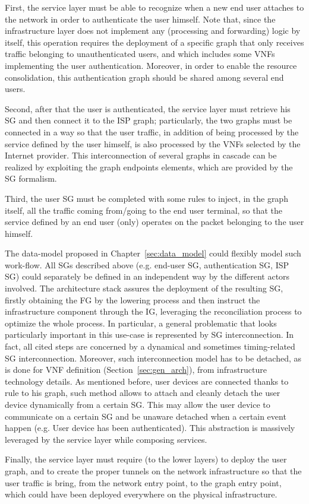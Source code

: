 First, the service layer must be able to recognize when a new end user attaches to the network in order to authenticate the user himself. 
Note that, since the infrastructure layer does not implement any (processing and forwarding) logic by itself, this operation requires the deployment of a specific graph that only receives traffic belonging to unauthenticated users, and which includes some VNFs implementing the user authentication.
Moreover, in order to enable the resource consolidation, this authentication graph should be shared among several end users.

Second, after that the user is authenticated, the service layer must retrieve his SG and then connect it to the ISP graph; particularly, the two graphs must be connected in a way so that the user traffic, in addition of being processed by the service defined by the user himself, is also processed by the VNFs selected by the Internet provider.
This interconnection of several graphs in cascade can be realized by exploiting the graph endpoints elements, which are provided by the SG formalism.

Third, the user SG must be completed with some rules  to inject, in the graph itself, all the traffic coming from/going to the end user terminal, so that the service defined by an end user (only) operates on the packet belonging to the user himself.


The data-model proposed in Chapter~\ref{sec:data_model} could flexibly model such work-flow. All SGs described above (e.g. end-user SG, authentication SG, ISP SG) could separately be defined in an independent way by the different actors involved. The architecture stack assures the deployment of the resulting SG, firstly obtaining the FG by the lowering process and then instruct the infrastructure component through the IG, leveraging the reconciliation process to optimize the whole process.
In particular, a general problematic that looks particularly important in this use-case is represented by SG interconnection. In fact, all cited steps are concerned by a dynamical and sometimes timing-related SG interconnection. Moreover, such interconnection model has to be detached, as is done for VNF definition (Section~\ref{sec:gen_arch}), from infrastructure technology details.
As mentioned before, user devices are connected thanks to rule to his graph, such method allows to attach and cleanly detach the user device dynamically from a certain SG. This may allow the user device to communicate on a certain SG and be unaware detached when a certain event happen (e.g. User device has been authenticated). This abstraction is massively leveraged by the service layer while composing services. 


Finally, the service layer must require (to the lower layers) to deploy the user graph, and to create the proper tunnels on the network infrastructure so that the user traffic is bring, from the network entry point, to the graph entry point, which could have been deployed everywhere on the physical infrastructure.
